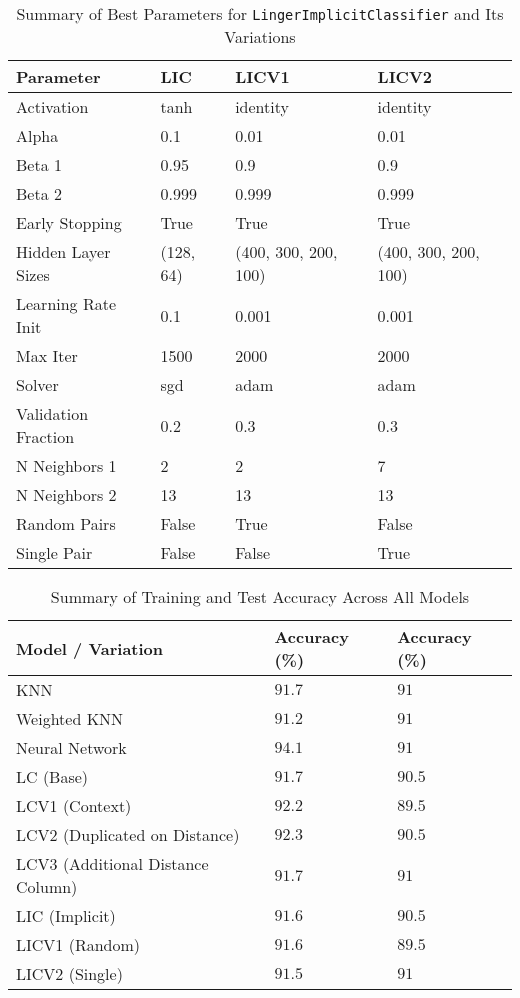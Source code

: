 \documentclass[a4paper, 12pt]{report}
\begin{document}
\begin{table}[H]
    \centering
    \caption{Summary of Best Parameters for \texttt{LingerImplicitClassifier} and Its Variations}
    \label{tab:best_parameters_LIC_variations_exp3}
    \footnotesize
    \begin{tabular}{|l|l|l|l|}
    \hline
    \textbf{Parameter} & \textbf{LIC} & \textbf{LICV1} & \textbf{LICV2} \\
    \hline
    Activation & tanh & identity & identity \\
    Alpha & 0.1 & 0.01 & 0.01 \\
    Beta 1 & 0.95 & 0.9 & 0.9 \\
    Beta 2 & 0.999 & 0.999 & 0.999 \\
    Early Stopping & True & True & True \\
    Hidden Layer Sizes & (128, 64) & (400, 300, 200, 100) & (400, 300, 200, 100) \\
    Learning Rate Init & 0.1 & 0.001 & 0.001 \\
    Max Iter & 1500 & 2000 & 2000 \\
    Solver & sgd & adam & adam \\
    Validation Fraction & 0.2 & 0.3 & 0.3 \\
    N Neighbors 1 & 2 & 2 & 7 \\
    N Neighbors 2 & 13 & 13 & 13 \\
    Random Pairs & False & True & False \\
    Single Pair & False & False & True \\
    \hline
    \end{tabular}
    \end{table}
\clearpage

\begin{table}[H]
    \centering
    \caption{Summary of Training and Test Accuracy Across All Models}
    \label{tab:summary_accuracy_all_models_exp3}
    \begin{tabular}{|l|l|l|}
    \toprule
    \textbf{Model / Variation} & \textbf{Accuracy (\%)} & \textbf{Accuracy (\%)} \\
    \midrule
    KNN & $91.7$ & $91$ \\
    Weighted KNN & $91.2$ & $91$ \\
    Neural Network & $94.1$ & $91$ \\
    LC (Base) & $91.7$ & $90.5$ \\
    LCV1 (Context) & $92.2$ & $89.5$ \\
    LCV2 (Duplicated on Distance) & $92.3$ & $90.5$ \\
    LCV3 (Additional Distance Column) & $91.7$ & $91$ \\
    LIC (Implicit) & $91.6$ & $90.5$ \\
    LICV1 (Random) & $91.6$ & $89.5$ \\
    LICV2 (Single) & $91.5$ & $91$ \\
    \bottomrule
    \end{tabular}
\end{table}
\end{document}
